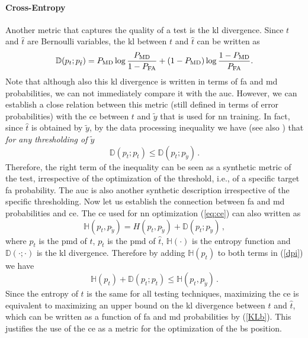 \documentclass[twocolumns]{IEEEtran}
\begin{document}
\paragraph{Cross-Entropy} Another metric that captures the quality of a test is the \ac{kl} divergence. Since $t$ and $\hat{t}$ are Bernoulli variables, the \ac{kl} between $t$ and $\hat{t}$ can be written as 
\begin{equation}
\mathbb D(p_t; p_{\hat{t}}) = P_{\rm MD} \log \frac{P_{\rm MD}}{1 - P_{\rm FA}} + (1-P_{\rm MD})\log \frac{1- P_{\rm MD}}{P_{\rm FA}}.
\label{KLb}
\end{equation}
Note that although also this \ac{kl} divergence is written in terms of \ac{fa} and \ac{md} probabilities, we can not immediately compare it with the \ac{auc}. However, we can establish a close relation between this metric (still defined in terms of error probabilities) with the \ac{ce} between $t$ and $\tilde{y}$ that is used for \ac{nn} training. In fact, since $\hat{t}$ is obtained by $\tilde{y}$, by the data processing inequality we have (see also \cite{Tomasin-Ferrante}) that {\em for any thresholding of $\tilde{y}$}
\begin{equation}
\mathbb D(p_t; p_{\hat{t}}) \leq \mathbb D(p_t; p_{\tilde{y}})\,.
\end{equation}
Therefore, the right term of the inequality can be seen as a synthetic metric of the test, irrespective of the optimization of the threshold, i.e., of a specific target \ac{fa} probability. The \ac{auc} is also another synthetic description irrespective of the specific thresholding. Now let us establish the connection between \ac{fa} and \ac{md} probabilities and \ac{ce}. The \ac{ce} used for \ac{nn} optimization (\ref{eq:ce})  can also written as 
\begin{equation}
\mathbb H(p_t,p_{\tilde{y}}) = H(p_t,p_{\tilde{y}}) +\mathbb D(p_t; p_{\tilde{y}})\,,
\label{dpi}
\end{equation}
where $p_t$ is the \ac{pmd} of $t$, $p_{\hat{t}}$ is the \ac{pmd} of $\hat{t}$, $\mathbb H(\cdot)$ is the entropy function and $\mathbb D(\cdot;\cdot)$ is the \ac{kl} divergence. Therefore by  adding $\mathbb H(p_t)$ to both terms in (\ref{dpi}) we have 
\begin{equation}
\mathbb H(p_t) +\mathbb  D(p_t; p_{\hat{t}}) \leq \mathbb H(p_t,p_{\tilde{y}})\,. 
\end{equation}
Since the entropy of $t$ is the same for all testing techniques, maximizing the \ac{ce} is equivalent to maximizing an upper bound on the \ac{kl} divergence between $t$ and $\hat{t}$, which can be written as a function of \ac{fa} and \ac{md} probabilities by (\ref{KLb}). This justifies the use of the \ac{ce} as a metric for the optimization of the \ac{bs} position.
\end{document}
